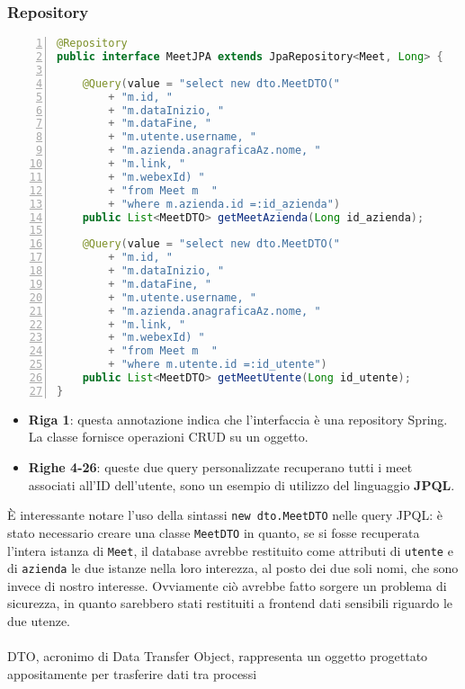 \subsubsection{Repository}
\begin{lstlisting}[language=java, frame=lines, basicstyle=\ttfamily\scriptsize, numbers=left]
@Repository
public interface MeetJPA extends JpaRepository<Meet, Long> {
    
    @Query(value = "select new dto.MeetDTO("
        + "m.id, "
        + "m.dataInizio, "
        + "m.dataFine, "
        + "m.utente.username, "
        + "m.azienda.anagraficaAz.nome, "
        + "m.link, "
        + "m.webexId) "
        + "from Meet m  "
        + "where m.azienda.id =:id_azienda")
    public List<MeetDTO> getMeetAzienda(Long id_azienda);
    
    @Query(value = "select new dto.MeetDTO("
        + "m.id, "
        + "m.dataInizio, "
        + "m.dataFine, "
        + "m.utente.username, "
        + "m.azienda.anagraficaAz.nome, "
        + "m.link, "
        + "m.webexId) "
        + "from Meet m  "
        + "where m.utente.id =:id_utente")
    public List<MeetDTO> getMeetUtente(Long id_utente);
}
\end{lstlisting}
\begin{itemize}
    \item \textbf{Riga 1}: questa annotazione indica che l'interfaccia è una repository Spring. La classe fornisce operazioni CRUD su un oggetto. 
    \cite{RepositorySpring}

    \item \textbf{Righe 4-26}: queste due query personalizzate recuperano tutti i meet associati all'ID dell'utente, sono un esempio di utilizzo
    del linguaggio \textbf{JPQL}. 
\end{itemize}
È interessante notare l'uso della sintassi \texttt{new dto.MeetDTO} nelle query JPQL: è stato necessario creare una classe \texttt{MeetDTO} in quanto, 
se si fosse recuperata l'intera istanza di \texttt{Meet}, il database avrebbe restituito come attributi di \texttt{utente} e di \texttt{azienda} le 
due istanze nella loro interezza, al posto dei due soli nomi, che sono invece di nostro interesse. Ovviamente ciò avrebbe fatto sorgere un 
problema di sicurezza, in quanto sarebbero stati restituiti a frontend dati sensibili riguardo le due utenze.
\\
\\
DTO, acronimo di Data Transfer Object, rappresenta un oggetto progettato appositamente per trasferire dati tra processi 
